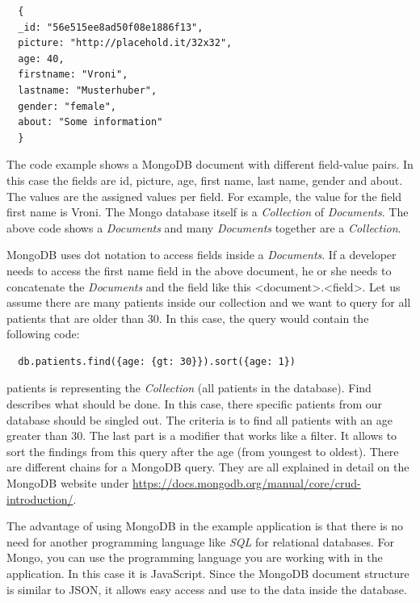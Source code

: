 \begin{verbatim}
  {
  _id: "56e515ee8ad50f08e1886f13",
  picture: "http://placehold.it/32x32",
  age: 40,
  firstname: "Vroni",
  lastname: "Musterhuber",
  gender: "female",
  about: "Some information"
  }
\end{verbatim}

The code example shows a MongoDB document with different field-value pairs. In this case the fields are id, picture, age, first name, last name, gender and
about. The values are the assigned values per field. For example, the value for the field first name is Vroni. The Mongo database itself is a \textit{Collection}
of \textit{Documents}. The above code shows a \textit{Documents} and many \textit{Documents} together are a \textit{Collection}.

MongoDB uses dot notation to access fields inside a \textit{Documents}. If a developer needs to access the first name field in the above document, he or she
needs to concatenate the \textit{Documents} and the field like this <document>.<field>. Let us assume there are many patients inside our collection and we
want to query for all patients that are older than 30. In this case, the query would contain the following code:

\begin{verbatim}
  db.patients.find({age: {gt: 30}}).sort({age: 1})
\end{verbatim}

patients is representing the \textit{Collection} (all patients in the database). Find describes what should be done. In this
case, there specific patients from our database should be singled out. The criteria is to find all patients with an age greater than 30. The last part is
a modifier that works like a filter. It allows to sort the findings from this query after the age (from youngest to oldest). There are different
chains for a MongoDB query. They are all explained in detail on the MongoDB website under \url{https://docs.mongodb.org/manual/core/crud-introduction/}.

The advantage of using MongoDB in the example application is that there is no need for another programming language like \textit{SQL} for relational databases.
For Mongo, you can use the programming language you are working with in the application. In this case it is JavaScript. Since the MongoDB document structure is
similar to JSON, it allows easy access and use to the data inside the database. \cite{chodorow2013mongodb}

